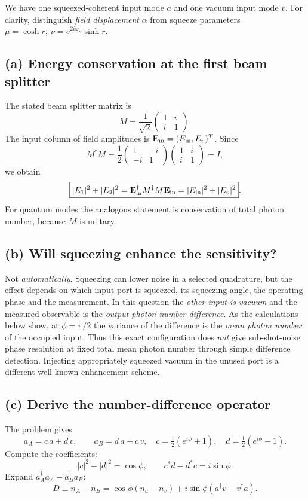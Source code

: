 
We have one squeezed-coherent input mode \(a\) and
one vacuum input mode \(v\).
For clarity, distinguish \emph{field displacement}
\(\alpha\) from squeeze parameters
\(\mu=\cosh r,\ \nu=e^{2i\varphi_S}\sinh r\).

\subsection*{(a) Energy conservation at the first beam splitter}
The stated beam splitter matrix is
\[
M=\frac1{\sqrt2}\begin{pmatrix}1&i\\i&1\end{pmatrix}.
\]
The input column of field amplitudes is
\(\mathbf E_{\rm in}=(E_{\rm in},E_v)^T\).
Since
\[
M^\dagger M=\frac12
\begin{pmatrix}1&-i\\-i&1\end{pmatrix}
\begin{pmatrix}1&i\\i&1\end{pmatrix}=I,
\]
we obtain
\[
\boxed{|E_1|^2+|E_2|^2=
\mathbf E_{\rm in}^\dagger M^\dagger M
\mathbf E_{\rm in}
=|E_{\rm in}|^2+|E_v|^2}.
\]
For quantum modes the analogous statement is
conservation of total photon number,
because \(M\) is unitary.

\subsection*{(b) Will squeezing enhance the sensitivity?}
Not \emph{automatically}. Squeezing can lower
noise in a selected quadrature, but the effect
depends on which input port is squeezed, its
squeezing angle, the operating phase and the
measurement. In this question the \emph{other input
is vacuum} and the measured observable is
the \emph{output photon-number difference}.
As the calculations below show, at \(\phi=\pi/2\)
the variance of the difference is the
\emph{mean photon number} of the occupied input.
Thus this exact configuration does \emph{not}
give sub-shot-noise phase resolution at fixed
total mean photon number through simple
difference detection. Injecting appropriately
squeezed vacuum in the unused port is a different
well-known enhancement scheme.

\subsection*{(c) Derive the number-difference operator}
The problem gives
\[
a_A=c\,a+d\,v,\qquad a_B=d\,a+c\,v,\quad
c=\tfrac12(e^{i\phi}+1),\quad
d=\tfrac12(e^{i\phi}-1).
\]
Compute the coefficients:
\[
|c|^2-|d|^2=\cos\phi,\qquad
c^*d-d^*c=i\sin\phi.
\]
Expand \(a_A^\dagger a_A-a_B^\dagger a_B\):
\[
\boxed{D\equiv n_A-n_B
=\cos\phi(n_a-n_v)
+i\sin\phi(a^\dagger v-v^\dagger a)}.
\]

